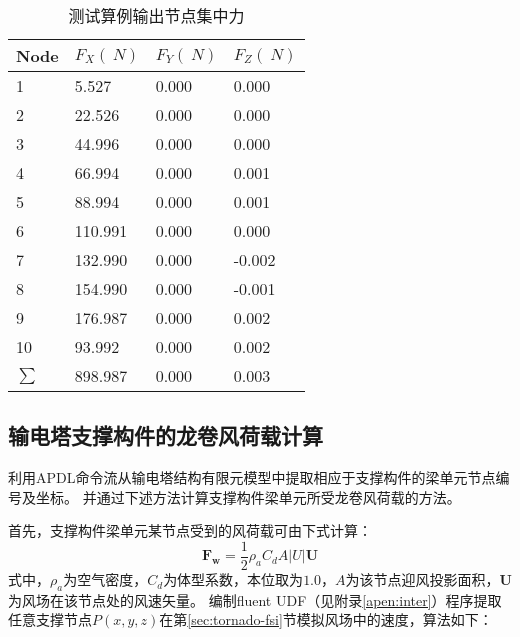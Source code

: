 \begin{table}[!htbp]
	\caption{测试算例输出节点集中力}
	\label{tab:example-force}
	\centering
	\begin{tabu} to 1.0\textwidth {X[c] X[2,c] X[2,c] X[2,c]}
		\toprule
		Node   & $F_X(\SI{}{N})$ & $F_Y(\SI{}{N})$ & $F_Z(\SI{}{N})$ \\
		      & 5.527           & 0.000           & 0.000           \\
		2      & 22.526          & 0.000           & 0.000           \\
		3      & 44.996          & 0.000           & 0.000           \\
		4      & 66.994          & 0.000           & 0.001           \\
		5      & 88.994          & 0.000           & 0.001           \\
		6      & 110.991         & 0.000           & 0.000           \\
		7      & 132.990         & 0.000           & -0.002          \\
		8      & 154.990         & 0.000           & -0.001          \\
		9      & 176.987         & 0.000           & 0.002           \\
		10     & 93.992          & 0.000           & 0.002           \\
    \midrule
		$\sum$ & 898.987         & 0.000           & 0.003           \\
		\bottomrule
	\end{tabu}
\end{table}

\subsection{输电塔支撑构件的龙卷风荷载计算}\label{sec:brace-load}
利用APDL命令流从输电塔结构有限元模型中提取相应于支撑构件的梁单元节点编号及坐标。
并通过下述方法计算支撑构件梁单元所受龙卷风荷载的方法。

首先，支撑构件梁单元某节点受到的风荷载可由下式计算\cite{savory2001modelling}：
\begin{equation}
	\bm{F_w} = \frac{1}{2} \rho_a C_d A |U| \bm{U}
\end{equation}
式中，$\rho_a$为空气密度，$C_d$为体型系数，本位取为$1.0$，$A$为该节点迎风投影面积，$\bm{U}$为风场在该节点处的风速矢量。
编制fluent UDF（见附录\ref{apen:inter}）程序提取任意支撑节点$P(x, y, z)$在第\ref{sec:tornado-fsi}节模拟风场中的速度，算法如下：

